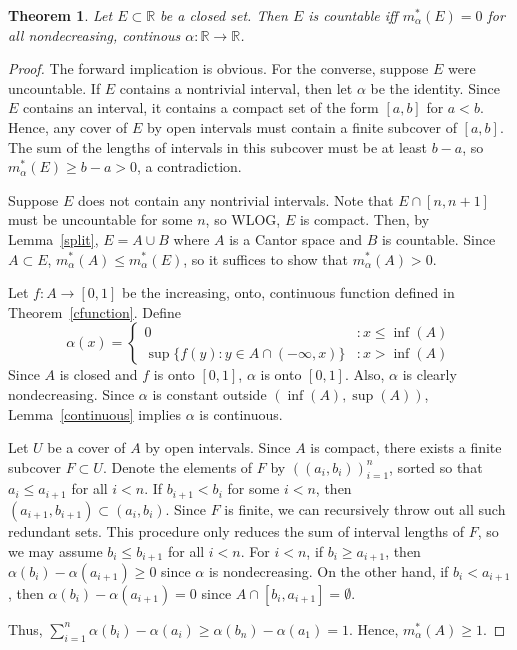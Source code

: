 \documentclass{article}
\newtheorem{theorem}{Theorem}
\newcommand{\R}{\mathbb{R}}
\newcommand{\m}{m^*_\alpha}
\begin{document}
\begin{theorem}
Let $E \subset \R$ be a closed set. Then $E$ is countable iff $\m(E) = 0$ for all nondecreasing, continous $\alpha:\mathbb{R} \rightarrow \mathbb{R}$.
\end{theorem}
\begin{proof}
The forward implication is obvious. For the converse, suppose $E$ were uncountable. If $E$ contains a nontrivial interval, then let $\alpha$ be the identity. Since $E$ contains an interval, it contains a compact set of the form $[a,b]$ for $a<b$. Hence, any cover of $E$ by open intervals must contain a finite subcover of $[a,b]$. The sum of the lengths of intervals in this subcover must be at least $b-a$, so $\m(E) \geq b - a > 0$, a contradiction.

Suppose $E$ does not contain any nontrivial intervals. Note that $E \cap [n,n+1]$ must be uncountable for some $n$, so WLOG, $E$ is compact. Then, by Lemma~\ref{split}, $E = A \cup B$ where $A$ is a Cantor space and $B$ is countable. Since $A \subset E$, $\m(A) \leq \m(E)$, so it suffices to show that $\m(A) > 0$.

Let $f:A \rightarrow [0,1]$ be the increasing, onto, continuous function defined in Theorem~\ref{cfunction}. Define
 \begin{displaymath}
   \alpha(x) = \left\{
     \begin{array}{lr}
       0 & : x \leq \inf(A)\\
       \sup\{f(y): y \in A \cap (-\infty, x)\} & : x > \inf(A)
     \end{array}
   \right.
\end{displaymath} 
Since $A$ is closed and $f$ is onto $[0,1]$, $\alpha$ is onto $[0,1]$. Also, $\alpha$ is clearly nondecreasing. Since $\alpha$ is constant outside $(\inf(A), \sup(A))$, Lemma~\ref{continuous} implies $\alpha$ is continuous.

Let $U$ be a cover of $A$ by open intervals. Since $A$ is compact, there exists a finite subcover $F \subset U$. Denote the elements of $F$ by  $((a_i, b_i))_{i=1}^n$, sorted so that $a_i \leq a_{i+1}$ for all $i<n$. If $b_{i+1} < b_i$ for some $i < n$, then $(a_{i+1}, b_{i+1}) \subset (a_i, b_i)$. Since $F$ is finite, we can recursively throw out all such redundant sets. This procedure only reduces the sum of interval lengths of $F$, so we may assume $b_i \leq b_{i+1}$ for all $i<n$. For $i < n$, if $b_i \geq a_{i+1}$, then $\alpha(b_i) - \alpha(a_{i+1}) \geq 0$ since $\alpha$ is nondecreasing. On the other hand, if $b_i < a_{i+1}$, then $\alpha(b_i) - \alpha(a_{i+1}) = 0$ since $A \cap [b_i, a_{i+1}] = \emptyset$. 

Thus, $\sum_{i=1}^n {\alpha(b_i) - \alpha(a_i)} \geq \alpha(b_n) - \alpha(a_1) = 1$. Hence, $\m(A) \geq 1$.
\end{proof}
\end{document}
